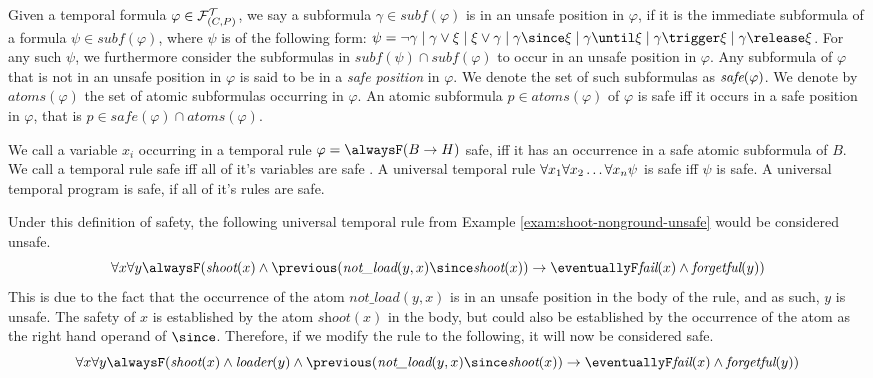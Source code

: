 \begin{definition}[Safety]
  Given a temporal formula $\varphi \in \mathcal{F}_{(C,P)}^\mathcal{T}$, we say a
  subformula $\gamma \in subf(\varphi)$ is in an unsafe position in
  $\varphi$, if it is the immediate subformula of a formula
  $\psi \in subf(\varphi)$, where $\psi$ is of the following form:
  $\psi = \neg \gamma \mid \gamma \vee \xi \mid \xi \vee \gamma \mid
  \gamma \since \xi \mid \gamma \until \xi \mid \gamma \trigger \xi
  \mid \gamma \release \xi$. For any such $\psi$, we furthermore
  consider the subformulas in $subf(\psi) \cap subf(\varphi)$ to occur
  in an unsafe position in $\varphi$. Any subformula of $\varphi$ that
  is not in an unsafe position in $\varphi$ is said to be in a
  \textit{safe position} in $\varphi$. We denote the set of such
  subformulas as $\textit{safe}(\varphi)$. We denote by $atoms(\varphi)$ the
  set of atomic subformulas occurring in $\varphi$. An atomic
  subformula $p \in atoms(\varphi)$ of $\varphi$ is safe iff it occurs
  in a safe position in $\varphi$, that is
  $p \in safe(\varphi) \cap atoms(\varphi)$.

  We call a variable $x_i$ occurring in a temporal rule
  $\varphi = \alwaysF(B \rightarrow H)$ safe, iff it has an occurrence
  in a safe atomic subformula of $B$. We call a temporal rule safe iff
  all of it's variables are safe . A universal temporal rule
  $\forall x_1 \forall x_2 \dots \forall x_n \psi$ is safe iff $\psi$ is safe. A universal temporal
  program is safe, if all of it's rules are safe.
\end{definition}
\begin{example}
  Under this definition of safety, the following universal temporal
  rule from Example \ref{exam:shoot-nonground-unsafe} would be
  considered unsafe.
\begin{equation*}
  \forall x \forall y \alwaysF( \textit{shoot}(x) \land \previous(\textit{not\_load}(y,x) \since \textit{shoot}(x)) 
  \rightarrow \eventuallyF \textit{fail}(x) \land \textit{forgetful}(y)) 
\end{equation*}
This is due to the fact that the occurrence of the atom
$\textit{not\_load}(y,x)$ is in an unsafe position in the body of the
rule, and as such, $y$ is unsafe. The safety of $x$ is established by
the atom $\textit{shoot}(x)$ in the body, but could also be
established by the occurrence of the atom as the right hand operand of
$\since$. Therefore, if we modify the rule to the following, it will now be considered safe.
\begin{equation*}
  \forall x \forall y \alwaysF( \textit{shoot}(x) \land \textit{loader}(y) \land \previous(\textit{not\_load}(y,x) \since \textit{shoot}(x)) 
  \rightarrow \eventuallyF \textit{fail}(x) \land \textit{forgetful}(y)) 
\end{equation*}
\end{example}

